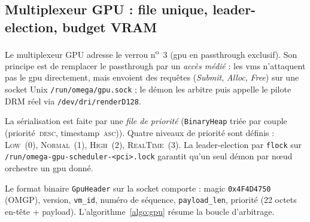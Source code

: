 \subsection{Multiplexeur GPU : file unique, leader-election, budget VRAM}

Le multiplexeur GPU adresse le verrou n\textsuperscript{o}~3 (\acrshort{gpu} en passthrough exclusif). Son principe est de remplacer le passthrough par un \emph{accès médié} : les \acrshort{vm}s n'attaquent pas le \acrshort{gpu} directement, mais envoient des requêtes (\emph{Submit}, \emph{Alloc}, \emph{Free}) sur une socket Unix \texttt{/run/omega/gpu.sock} ; le démon les arbitre puis appelle le pilote DRM réel via \texttt{/dev/dri/renderD128}.

La sérialisation est faite par une \emph{file de priorité} (\texttt{BinaryHeap} triée par couple (priorité~\textsc{desc}, timestamp~\textsc{asc})). Quatre niveaux de priorité sont définis : \textsc{Low}~(0), \textsc{Normal}~(1), \textsc{High}~(2), \textsc{RealTime}~(3). La leader-election par \texttt{flock} sur \texttt{/run/omega-gpu-scheduler-<pci>.lock} garantit qu'un seul démon par nœud orchestre un \acrshort{gpu} donné.

Le format binaire \texttt{GpuHeader} sur la socket comporte : magic \texttt{0x4F4D4750} (\og{}OMGP\fg{}), version, \texttt{vm\_id}, numéro de séquence, \texttt{payload\_len}, priorité (22 octets en-tête + payload). L'algorithme~\ref{algo:gpu} résume la boucle d'arbitrage.

\begin{algorithm}[H]
\caption{Multiplexeur GPU, boucle d'arbitrage}
\label{algo:gpu}
\end{algorithm}

